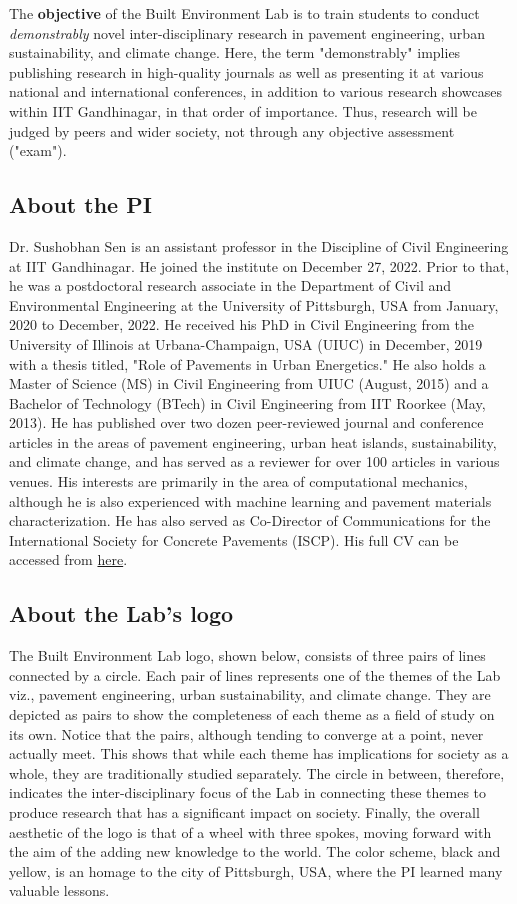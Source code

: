 \documentclass[12pt]{article}
\begin{document}
The \textbf{objective} of the Built Environment Lab is to train students to conduct \textit{demonstrably} novel inter-disciplinary research in pavement engineering, urban sustainability, and climate change. Here, the term "demonstrably" implies publishing research in high-quality journals as well as presenting it at various national and international conferences, in addition to various research showcases within IIT Gandhinagar, in that order of importance. Thus, research will be judged by peers and wider society, not through any objective assessment ("exam"). 

\subsection{About the PI}
Dr. Sushobhan Sen is an assistant professor in the Discipline of Civil Engineering at IIT Gandhinagar. He joined the institute on December 27, 2022. Prior to that, he was a postdoctoral research associate in the Department of Civil and Environmental Engineering at the University of Pittsburgh, USA from January, 2020 to December, 2022. He received his PhD in Civil Engineering from the University of Illinois at Urbana-Champaign, USA (UIUC) in December, 2019 with a thesis titled, "Role of Pavements in Urban Energetics." He also holds a Master of Science (MS) in Civil Engineering from UIUC (August, 2015) and a Bachelor of Technology (BTech) in Civil Engineering from IIT Roorkee (May, 2013). He has published over two dozen peer-reviewed journal and conference articles in the areas of pavement engineering, urban heat islands, sustainability, and climate change, and has served as a reviewer for over 100 articles in various venues. His interests are primarily in the area of computational mechanics, although he is also experienced with machine learning and pavement materials characterization. He has also served as Co-Director of Communications for the International Society for Concrete Pavements (ISCP). His full CV can be accessed from \href{https://github.com/sushobhansen/CV/blob/master/sushobhan-sen-cv.pdf}{here}.

\subsection{About the Lab's logo}
The Built Environment Lab logo, shown below, consists of three pairs of lines connected by a circle. Each pair of lines represents one of the themes of the Lab viz., pavement engineering, urban sustainability, and climate change. They are depicted as pairs to show the completeness of each theme as a field of study on its own. Notice that the pairs, although tending to converge at a point, never actually meet. This shows that while each theme has implications for society as a whole, they are traditionally studied separately. The circle in between, therefore, indicates the inter-disciplinary focus of the Lab in connecting these themes to produce research that has a significant impact on society. Finally, the overall aesthetic of the logo is that of a wheel with three spokes, moving forward with the aim of the adding new knowledge to the world. The color scheme, black and yellow, is an homage to the city of Pittsburgh, USA, where the PI learned many valuable lessons. 
\end{document}
